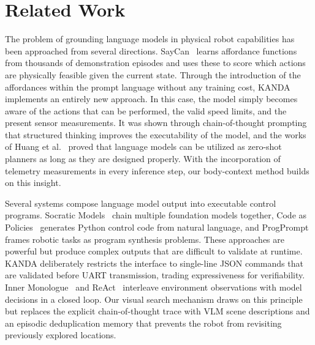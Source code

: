 \documentclass[conference]{IEEEtran}
\begin{document}
\section{Related Work}
\label{sec:related}

The problem of grounding language models in physical robot capabilities has been approached from several directions. SayCan~\cite{ahn2022saycan} learns affordance functions from thousands of demonstration episodes and uses these to score which actions are physically feasible given the current state. Through the introduction of the affordances within the prompt language without any training cost, KANDA implements an entirely new approach. In this case, the model simply becomes aware of the actions that can be performed, the valid speed limits, and the present sensor measurements. It was shown through chain-of-thought prompting~\cite{wei2022cot} that structured thinking improves the executability of the model, and the works of Huang et al.~\cite{huang2022zeroshot} proved that language models can be utilized as zero-shot planners as long as they are designed properly. With the incorporation of telemetry measurements in every inference step, our body-context method builds on this insight.

Several systems compose language model output into executable control programs. Socratic Models~\cite{zeng2023socratic} chain multiple foundation models together, Code as Policies~\cite{liang2023code} generates Python control code from natural language, and ProgPrompt~\cite{singh2023progprompt} frames robotic tasks as program synthesis problems. These approaches are powerful but produce complex outputs that are difficult to validate at runtime. KANDA deliberately restricts the interface to single-line JSON commands that are validated before UART transmission, trading expressiveness for verifiability. Inner Monologue~\cite{huang2022innermonologue} and ReAct~\cite{yao2023react} interleave environment observations with model decisions in a closed loop. Our visual search mechanism draws on this principle but replaces the explicit chain-of-thought trace with VLM scene descriptions and an episodic deduplication memory that prevents the robot from revisiting previously explored locations.
\end{document}
